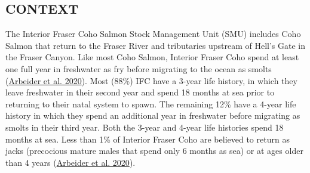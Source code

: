 \documentclass[11pt]{book}
\begin{document}
\hypertarget{context}{%
\subsection{CONTEXT}\label{context}}

The Interior Fraser Coho Salmon Stock Management Unit (SMU) includes Coho Salmon that return to the Fraser River and tributaries upstream of Hell's Gate in the Fraser Canyon. Like most Coho Salmon, Interior Fraser Coho spend at least one full year in freshwater as fry before migrating to the ocean as smolts (\protect\hyperlink{ref-arbeiderInteriorFraserCoho2020}{Arbeider et al. 2020}). Most (88\%) IFC have a 3-year life history, in which they leave freshwater in their second year and spend 18 months at sea prior to returning to their natal system to spawn. The remaining 12\% have a 4-year life history in which they spend an additional year in freshwater before migrating as smolts in their third year. Both the 3-year and 4-year life histories spend 18 months at sea. Less than 1\% of Interior Fraser Coho are believed to return as jacks (precocious mature males that spend only 6 months as sea) or at ages older than 4 years (\protect\hyperlink{ref-arbeiderInteriorFraserCoho2020}{Arbeider et al. 2020}).
\end{document}
